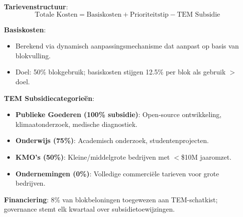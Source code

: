 \documentclass[11pt]{article}
\begin{document}
\textbf{Tarievenstructuur}:
\begin{equation}
\text{Totale Kosten} = \text{Basiskosten} + \text{Prioriteitstip} - \text{TEM Subsidie}
\end{equation}

\textbf{Basiskosten}:
\begin{itemize}[noitemsep]
  \item Berekend via dynamisch aanpassingsmechanisme dat aanpast op basis van blokvulling.
  \item Doel: 50\% blokgebruik; basiskosten stijgen 12.5\% per blok als gebruik $>$ doel.
\end{itemize}

\textbf{TEM Subsidiecategorieën}:
\begin{itemize}[noitemsep]
  \item \textbf{Publieke Goederen (100\% subsidie)}: Open-source ontwikkeling, klimaatonderzoek, medische diagnostiek.
  \item \textbf{Onderwijs (75\%)}: Academisch onderzoek, studentenprojecten.
  \item \textbf{KMO's (50\%)}: Kleine/middelgrote bedrijven met $<$\$10M jaaromzet.
  \item \textbf{Ondernemingen (0\%)}: Volledige commerciële tarieven voor grote bedrijven.
\end{itemize}

\textbf{Financiering}: 8\% van blokbeloningen toegewezen aan TEM-schatkist; governance stemt elk kwartaal over subsidietoewijzingen.
\end{document}
